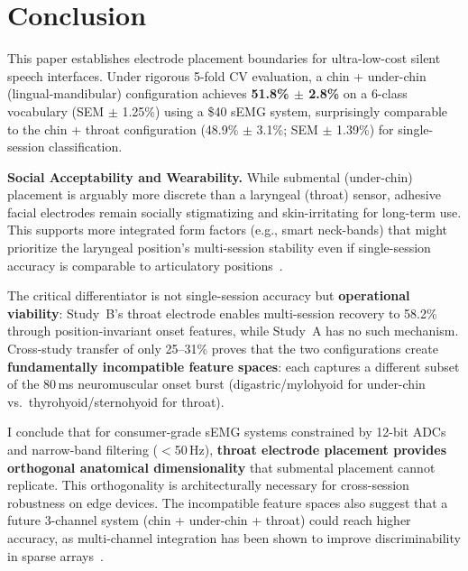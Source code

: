 \documentclass{article}
\begin{document}
\section{Conclusion}

This paper establishes electrode placement boundaries for ultra-low-cost silent speech interfaces. Under rigorous 5-fold CV evaluation, a chin + under-chin (lingual-mandibular) configuration achieves \textbf{51.8\% $\pm$ 2.8\%} on a 6-class vocabulary (SEM $\pm$ 1.25\%) using a \$40 sEMG system, surprisingly comparable to the chin + throat configuration (48.9\% $\pm$ 3.1\%; SEM $\pm$ 1.39\%) for single-session classification.

\textbf{Social Acceptability and Wearability.} While submental (under-chin) placement is arguably more discrete than a laryngeal (throat) sensor, adhesive facial electrodes remain socially stigmatizing and skin-irritating for long-term use. This supports more integrated form factors (e.g., smart neck-bands) that might prioritize the laryngeal position's multi-session stability even if single-session accuracy is comparable to articulatory positions~\cite{kapur2018}.

The critical differentiator is not single-session accuracy but \textbf{operational viability}: Study~B's throat electrode enables multi-session recovery to 58.2\% through position-invariant onset features, while Study~A has no such mechanism. Cross-study transfer of only 25--31\% proves that the two configurations create \textbf{fundamentally incompatible feature spaces}: each captures a different subset of the 80\,ms neuromuscular onset burst (digastric/mylohyoid for under-chin vs.\ thyrohyoid/sternohyoid for throat).

I conclude that for consumer-grade sEMG systems constrained by 12-bit ADCs and narrow-band filtering ($<$50\,Hz), \textbf{throat electrode placement provides orthogonal anatomical dimensionality} that submental placement cannot replicate. This orthogonality is architecturally necessary for cross-session robustness on edge devices. The incompatible feature spaces also suggest that a future 3-channel system (chin + under-chin + throat) could reach higher accuracy, as multi-channel integration has been shown to improve discriminability in sparse arrays~\cite{saejong2018}.

\end{document}
